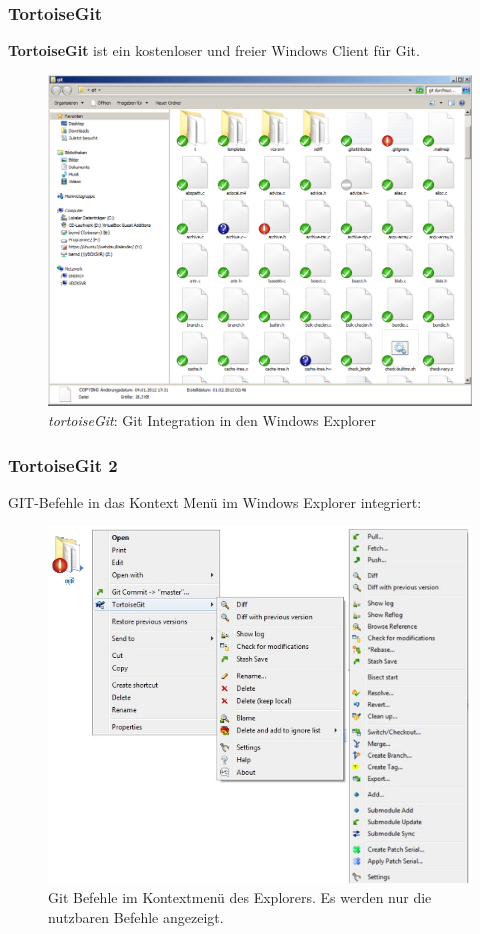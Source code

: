 \documentclass{beamer}
\begin{document}
\begin{frame}\frametitle{TortoiseGit}
\textbf{TortoiseGit} ist ein kostenloser und freier Windows Client für Git.

\begin{figure}
\includegraphics[scale=0.25]{Bilder/TortoiseGitIcon4} 
\caption{\textit{tortoiseGit}: Git Integration in den Windows Explorer}
\end{figure}
\end{frame}

\begin{frame}\frametitle{TortoiseGit 2}
GIT-Befehle in das Kontext Menü im Windows Explorer integriert:

\begin{figure}
\includegraphics[scale=0.5]{Bilder/TortoiseGita} 
\caption{Git Befehle im Kontextmenü des Explorers. Es werden nur die nutzbaren Befehle angezeigt.}
\end{figure}
\end{frame}
\end{document}
